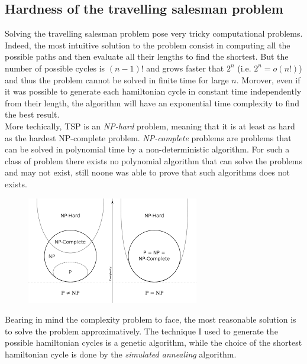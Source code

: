 \documentclass{article}
\begin{document}
\subsection{Hardness of the travelling salesman problem}
Solving the travelling salesman problem pose very tricky computational problems. Indeed, the most intuitive solution to the problem consist in computing all the possible paths and then evaluate all their lengths to find the shortest. But the number of possible cycles is $(n-1)!$ and grows faster that $2^n$ (i.e. $2^n = o(n!)$) and thus the problem cannot be solved in finite time for large $n$. Morover, even if it was possible to generate each hamiltonian cycle in constant time independently from their length, the algorithm will have an exponential time complexity to find the best result.  \\
More techically, TSP is an \textit{NP-hard} problem, meaning that it is at least as hard as the hardest NP-complete problem. \textit{NP-complete} problems are problems that can be solved in polynomial time by a non-deterministic algorithm. For such a class of problem there exists no polynomial algorithm that can solve the problems and may not exist, still noone was able to prove that such algorithms does not exists.
\begin{figure}[H]
\includegraphics[scale=1]{complexity_classes.png} 
\centering
\end{figure}
\noindent Bearing in mind the complexity problem to face, the most reasonable solution is to solve the problem approximatively. The technique I used to generate the possible hamiltonian cycles is a genetic algorithm, while the choice of the shortest hamiltonian cycle is done by the \textit{simulated annealing} algorithm.
\end{document}
